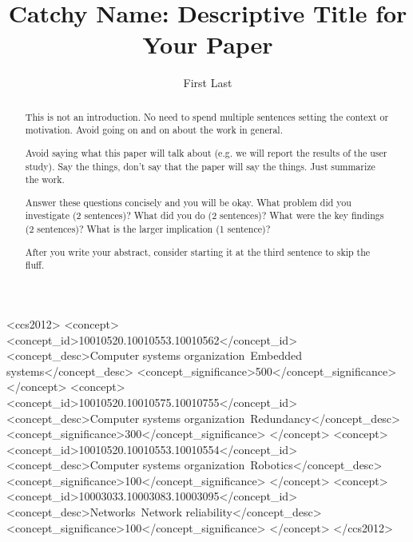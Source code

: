 \documentclass[manuscript,review,anonymous]{acmart}
\begin{document}
\title{Catchy Name: Descriptive Title for Your Paper}

\author{First Last}

\renewcommand{\shortauthors}{Lastname, et al.}

\begin{abstract}
This is not an introduction.
No need to spend multiple sentences setting the context or motivation.
Avoid going on and on about the work in general.

Avoid saying what this paper will talk about (e.g. we will report the results of the user study).
Say the things, don't say that the paper will say the things.
Just summarize the work.

Answer these questions concisely and you will be okay.
What problem did you investigate (2 sentences)?
What did you do (2 sentences)?
What were the key findings (2 sentences)?
What is the larger implication (1 sentence)?

After you write your abstract, consider starting it at the third sentence to skip the fluff.
\end{abstract}

\begin{CCSXML}
<ccs2012>
 <concept>
  <concept_id>10010520.10010553.10010562</concept_id>
  <concept_desc>Computer systems organization~Embedded systems</concept_desc>
  <concept_significance>500</concept_significance>
 </concept>
 <concept>
  <concept_id>10010520.10010575.10010755</concept_id>
  <concept_desc>Computer systems organization~Redundancy</concept_desc>
  <concept_significance>300</concept_significance>
 </concept>
 <concept>
  <concept_id>10010520.10010553.10010554</concept_id>
  <concept_desc>Computer systems organization~Robotics</concept_desc>
  <concept_significance>100</concept_significance>
 </concept>
 <concept>
  <concept_id>10003033.10003083.10003095</concept_id>
  <concept_desc>Networks~Network reliability</concept_desc>
  <concept_significance>100</concept_significance>
 </concept>
</ccs2012>
\end{CCSXML}

\end{document}
